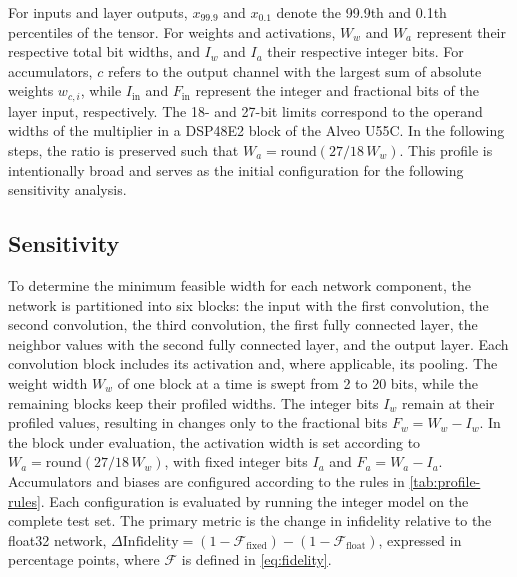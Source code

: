 For inputs and layer outputs, $x_{99.9}$ and $x_{0.1}$ denote the 99.9th and 0.1th percentiles of the tensor.
For weights and activations, $W_w$ and $W_a$ represent their respective total bit widths, and $I_w$ and $I_a$ their respective integer bits.
For accumulators, $c$ refers to the output channel with the largest sum of absolute weights $w_{c,i}$, while $I_{\mathrm{in}}$ and $F_{\mathrm{in}}$ represent the integer and fractional bits of the layer input, respectively. The 18- and 27-bit limits correspond to the operand widths of the multiplier in a DSP48E2 block of the Alveo U55C. In the following steps, the ratio is preserved such that $W_a = \mathrm{round}(27/18\,W_w)$.
This profile is intentionally broad and serves as the initial configuration for the following sensitivity analysis.

\subsection{Sensitivity} To determine the minimum feasible width for each network component, the network is partitioned into six blocks: the input with the first convolution, the second convolution, the third convolution, the first fully connected layer, the neighbor values with the second fully connected layer, and the output layer. Each convolution block includes its activation and, where applicable, its pooling. The weight width $W_w$ of one block at a time is swept from 2 to 20 bits, while the remaining blocks keep their profiled widths. The integer bits $I_w$ remain at their profiled values, resulting in changes only to the fractional bits $F_w = W_w - I_w$. In the block under evaluation, the activation width is set according to $W_a = \mathrm{round}(27/18\,W_w)$, with fixed integer bits $I_a$ and $F_a = W_a - I_a$. Accumulators and biases are configured according to the rules in \cref{tab:profile-rules}. Each configuration is evaluated by running the integer model on the complete test set. The primary metric is the change in infidelity relative to the float32 network, $\Delta\mathrm{Infidelity} = (1 - \mathcal{F}_{\mathrm{fixed}}) - (1 - \mathcal{F}_{\mathrm{float}})$, expressed in percentage points, where $\mathcal{F}$ is defined in \cref{eq:fidelity}.

